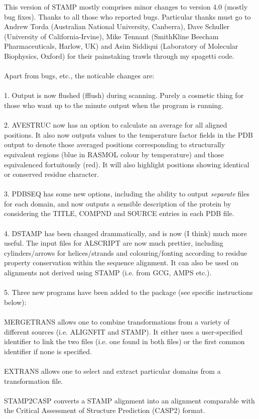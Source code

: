 This version of STAMP mostly comprises minor changes to version 4.0 (mostly bug fixes).
Thanks to all those who reported bugs.  Particular thanks must go to Andrew Torda 
(Australian National University, Canberra), Dave Schuller (University of California-Irvine),
Mike Tennant (SmithKline Beecham Pharmaceuticals, Harlow, UK)
and Asim Siddiqui (Laboratory of Molecular
Biophysics, Oxford) for their painstaking trawls through my spagetti code.\\
\\
Apart from bugs, etc., the noticable changes are:\\
\\
1. Output is now flushed (fflush) during scanning.  Purely a cosmetic thing for those who
want up to the minute output when the program is running.\\
\\
2. AVESTRUC now has an option to calculate an average for all aligned positions.  It also
now outputs values to the temperature factor fields in the PDB output to denote those
averaged positions corresponding to structurally equivalent regions (blue in RASMOL 
colour by temperature) and those equivalenced fortuitously (red).  It will also highlight
positions showing identical or conserved residue character.\\
\\
3. PDBSEQ has some new options, including the ability to output {\em separate} files
for each domain, and now outputs a sensible description of the protein by
considering the TITLE, COMPND and SOURCE entries in each PDB file.\\
\\
4. DSTAMP has been changed drammatically, and is now (I think) much more useful.  The
input files for ALSCRIPT are now much prettier, including cylinders/arrows for helices/strands 
and colouring/fonting according to residue property conservation within the sequence alignment.
It can also be used on alignments not derived using STAMP (i.e. from GCG, AMPS etc.).\\
\\
5. Three new programs have been added to the package (see specific instructions below):\\
\\
MERGETRANS allows one to combine transformations from a variety of different 
sources (i.e. ALIGNFIT and STAMP).  It either uses a user-specified identifier to link the 
two files (i.e. one found in both files) or the first common identifier if none is specified.\\
\\
EXTRANS allows one to select and extract particular domains from a transformation file. \\
\\
STAMP2CASP converts a STAMP alignment into an alignment comparable with the Critical Assessment of
Structure Prediction (CASP2) format.

